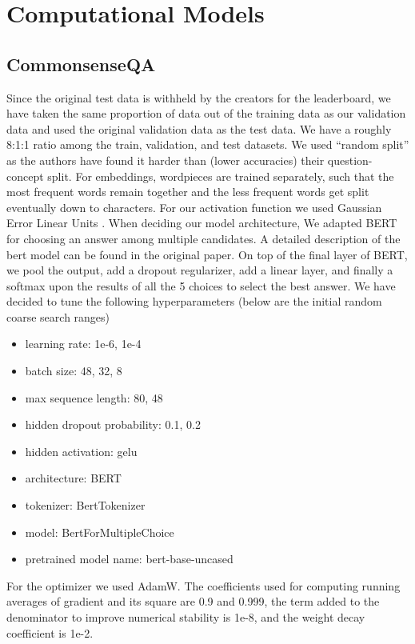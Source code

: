 \documentclass[11pt,a4paper]{article}
\begin{document}
\section{Computational Models}

\subsection{CommonsenseQA}
Since the original test data is withheld by the creators for the leaderboard, we have taken the same proportion of data out of the training data as our validation data and used the original validation data as the test data. We have a roughly 8:1:1 ratio among the train, validation, and test datasets. We used “random split” as the authors have found it harder than (lower accuracies) their question-concept split. For embeddings, wordpieces are trained separately, such that the most frequent words remain together and the less frequent words get split eventually down to characters. For our activation function we used Gaussian Error Linear Units \citep{hendrycks2020gaussian}. When deciding our model architecture, We adapted BERT for choosing an answer among multiple candidates. A detailed description of the bert model can be found in the original paper. On top of the final layer of BERT, we pool the output, add a dropout regularizer, add a linear layer, and finally a softmax upon the results of all the 5 choices to select the best answer. We have decided to tune the following hyperparameters (below are the initial random coarse search ranges)

\begin{itemize}
    \item learning rate:  1e-6, 1e-4
    \item batch size:  48, 32, 8 
    \item max sequence length:  80, 48
    \item hidden dropout probability:  0.1, 0.2
    \item hidden activation:  gelu
    \item architecture: BERT
    \item tokenizer: BertTokenizer
    \item model:  BertForMultipleChoice
    \item pretrained model name: bert-base-uncased
\end{itemize}

For the optimizer we used AdamW. The coefficients used for computing running averages of gradient and its square are 0.9 and 0.999, the term added to the denominator to improve numerical stability is 1e-8, and the weight decay coefficient is 1e-2.
\end{document}
